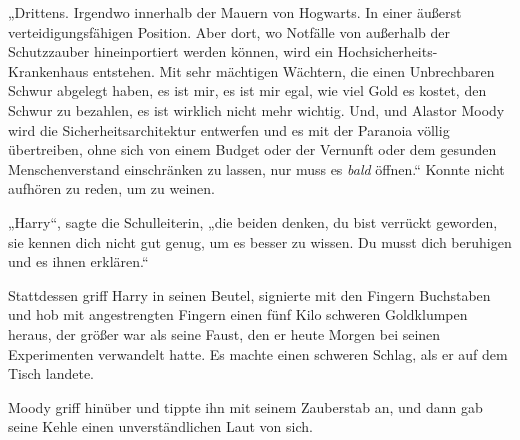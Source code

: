 „Drittens. Irgendwo innerhalb der Mauern von Hogwarts. In einer äußerst verteidigungsfähigen Position. Aber dort, wo Notfälle von außerhalb der Schutzzauber hineinportiert werden können, wird ein Hochsicherheits-Krankenhaus entstehen. Mit sehr mächtigen Wächtern, die einen Unbrechbaren Schwur abgelegt haben, es ist mir, es ist mir egal, wie viel Gold es kostet, den Schwur zu bezahlen, es ist wirklich nicht mehr wichtig. Und, und Alastor Moody wird die Sicherheitsarchitektur entwerfen und es mit der Paranoia völlig übertreiben, ohne sich von einem Budget oder der Vernunft oder dem gesunden Menschenverstand einschränken zu lassen, nur muss es \emph{bald} öffnen.“ Konnte nicht aufhören zu reden, um zu weinen.

„Harry“, sagte die Schulleiterin, „die beiden denken, du bist verrückt geworden, sie kennen dich nicht gut genug, um es besser zu wissen. Du musst dich beruhigen und es ihnen erklären.“

Stattdessen griff Harry in seinen Beutel, signierte mit den Fingern Buchstaben und hob mit angestrengten Fingern einen fünf Kilo schweren Goldklumpen heraus, der größer war als seine Faust, den er heute Morgen bei seinen Experimenten verwandelt hatte. Es machte einen schweren Schlag, als er auf dem Tisch landete.

Moody griff hinüber und tippte ihn mit seinem Zauberstab an, und dann gab seine Kehle einen unverständlichen Laut von sich.

